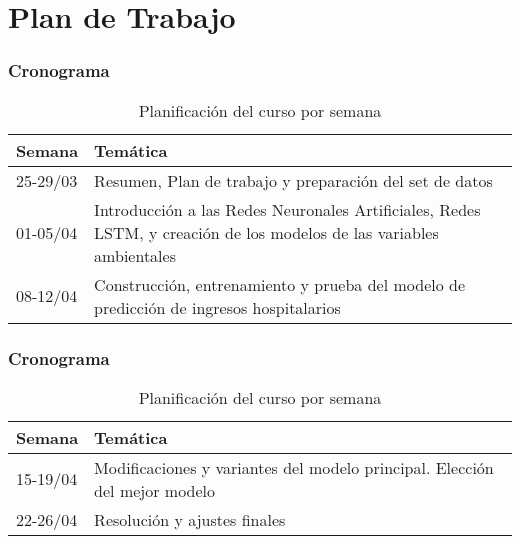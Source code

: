 
\section{Plan de Trabajo}

\begin{frame}
	\frametitle{Cronograma}
	
	\begin{table}[h]
		\centering
		\begin{tabular}{|l|p{8cm}|}
			\hline
			Semana & Temática \\ \hline
			25-29/03 & Resumen, Plan de trabajo y preparación del set de datos \\ \hline
			01-05/04 & Introducción a las Redes Neuronales Artificiales, Redes LSTM, y creación de los modelos de las variables ambientales\\ \hline
			08-12/04 & Construcción, entrenamiento y prueba del modelo de predicción de ingresos hospitalarios \\ \hline
		\end{tabular}
		\caption{Planificación del curso por semana}
		\label{table:plan_semanal1}
	\end{table}

\end{frame}


\begin{frame}
	\frametitle{Cronograma}
	
	\begin{table}[h]
		\centering
		\begin{tabular}{|l|p{8cm}|}
			\hline
			Semana & Temática \\ \hline
			15-19/04 & Modificaciones y variantes del modelo principal. Elección del mejor modelo\\ \hline
			22-26/04 & Resolución y ajustes finales  \\ \hline
		\end{tabular}
		\caption{Planificación del curso por semana}
		\label{plan_semanal2}
	\end{table}


\end{frame}


